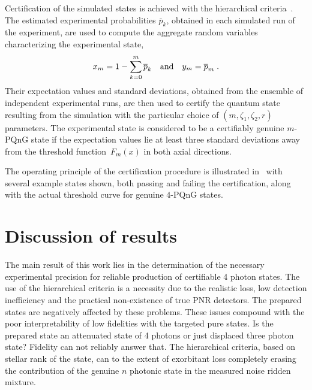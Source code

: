 \documentclass{article}
\begin{document}
Certification of the simulated states is achieved with the hierarchical criteria~\cite{lachman2019}. The estimated experimental probabilities $\overline{p}_{k}$, obtained in each simulated run of the experiment, are used to compute the aggregate random variables characterizing the experimental state,
%
\begin{equation}
  x_{m} = 1 - \sum_{k = 0}^{m} \overline{p}_{k} 
  \quad\text{and}\quad
  y_{m} = \overline{p}_{m} 
  \;\text{.}
\end{equation}
%
Their expectation values and standard deviations, obtained from the ensemble of independent experimental runs, are then used to certify the quantum state resulting from the simulation with the particular choice of $(m, \zeta_{1}, \zeta_{2}, r)$ parameters. The experimental state is considered to be a certifiably genuine $m$-PQnG state if the expectation values lie at least three standard deviations away from the threshold function~$F_{m} (x)$ in both axial directions.

The operating principle of the certification procedure is illustrated in~ with several example states shown, both passing and failing the certification, along with the actual threshold curve for genuine $4$-PQnG states.

%

%
%

\FloatBarrier
\section{Discussion of results}

The main result of this work lies in the determination of the necessary experimental precision for reliable production of certifiable 4 photon states. The use of the hierarchical criteria is a necessity due to the realistic loss, low detection inefficiency and the practical non-existence of true PNR detectors. The prepared states are negatively affected by these problems. These issues compound with the poor interpretability of low fidelities with the targeted pure states. Is the prepared state an attenuated state of 4 photons or just displaced three photon state? Fidelity can not reliably answer that. The hierarchical criteria, based on stellar rank of the state, can to the extent of exorbitant loss completely erasing the contribution of the genuine $n$ photonic state in the measured noise ridden mixture.
\end{document}
